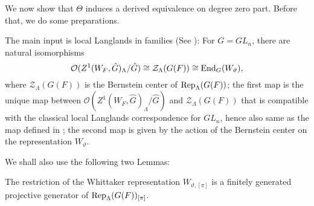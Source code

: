 We now show that $\Theta$ induces a derived equivalence on degree zero part. Before that, we do some preparations.

The main input is local Langlands in families (See \cite{helm2018converse}): For $G=GL_n$, there are natural isomorphisms
$$\mathcal{O}(Z^1(W_F, \hat{G})_{\Lambda}/\hat{G}) \cong \mathcal{Z}_{\Lambda}(G(F)) \cong \operatorname{\operatorname{End}}_{G}(W_{\vartheta}),$$
where $\mathcal{Z}_{\Lambda}(G(F))$ is the Bernstein center of $\operatorname{\operatorname{Rep}}_{\Lambda}(G(F))$; the first map is the unique map between $\mathcal{O}(Z^1(W_F, \hat{G})_{\Lambda}/\hat{G})$ and $\mathcal{Z}_{\Lambda}(G(F))$ that is compatible with the classical local Langlands correspondence for $GL_n$, hence also same as the map defined in \cite[Section VIII.4]{fargues2021geometrization}; the second map is given by the action of the Bernstein center on the representation $W_{\vartheta}$.

We shall also use the following two Lemmas: 

\begin{lemma}\label{Lemma Whittaker is proj gen}
	The restriction of the Whittaker representation $W_{\vartheta, [\pi]}$ is a finitely generated projective generator of $\operatorname{\operatorname{Rep}}_{\Lambda}(G(F))_{[\pi]}$.
\end{lemma}

